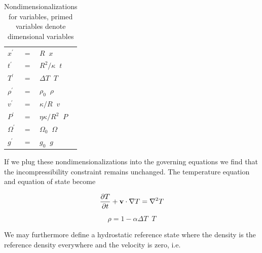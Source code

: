 \documentclass[extra,mreferee]{gji}
\begin{document}
\begin{table}
\centering
\caption{Nondimensionalizations for variables, primed variables denote dimensional variables}
\label{tab:nondim_convert}
\begin{tabular}{@{}lll}
$x^\prime$ &=& $R \;\; x$ \\
$t^\prime$ &=& $R^2/\kappa \;\; t$ \\
$T^\prime$ &=& $\Delta T \;\; T$ \\
$\rho^\prime$ &=& $\rho_0 \;\; \rho$\\
$v^\prime$ &=& $\kappa/R \;\; v$ \\
$P^\prime$ &=& $\eta \kappa/R^2 \;\; P$ \\
$\Omega^\prime$ &=& $\Omega_0 \;\; \Omega$ \\
$g^\prime$ &=& $g_0 \;\; g$
\end{tabular}
\end{table}

If we plug these nondimensionalizations into the governing equations we find that the incompressibility constraint remains unchanged.  
The temperature equation and equation of state become

\begin{equation}
\frac{\partial T}{\partial t} + {\bf v} \cdot \nabla T = \nabla^2 T
\end{equation}

\begin{equation}
\rho = 1 - \alpha \Delta T \;\;  T
\end{equation}

We may furthermore define a hydrostatic reference state where the density is the reference density everywhere and the velocity is zero, i.e.
\end{document}

